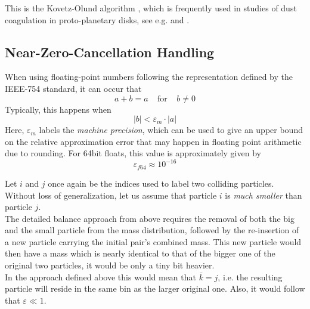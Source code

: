         This is the Kovetz-Olund algorithm \cite{kovetz_olund_1969}, which is frequently used 
        in studies of dust coagulation in proto-planetary disks, see e.g.
        \cite{brauer_dullemond_henning_2007} and \cite{birnstiel_dullemond_brauer_2010}.
    
    \clearpage\subsection{Near-Zero-Cancellation Handling}
    \label{sec:near_zero_cancellation_handling}
    
        When using floating-point numbers following the representation defined
        by the IEEE-754 standard, it can occur that
        \begin{equation}
          a + b = a
          \ \ \ \ \ \text{for} \ \ \ \ \
          b\neq0
        \end{equation}
        Typically, this happens when
        \begin{equation}
            |b| < \varepsilon_m \cdot |a|
        \end{equation}
        Here, $\varepsilon_m$ labels the \textit{machine precision}, which can be used to give 
        an upper bound on the relative approximation error that may happen in floating point 
        arithmetic due to rounding. For 64bit floats, this value is approximately given by
        \begin{equation}
            \varepsilon_{f64} \approx 10^{-16}
        \end{equation}
        
        Let $i$ and $j$ once again be the indices used to label two colliding particles. 
        Without loss of generalization, let us assume that particle $i$ is 
        \textit{much smaller} than particle $j$. \\
        
        The detailed balance approach from above requires the removal of both the big and the small 
        particle from the mass distribution, followed by the re-insertion of a new particle 
        carrying the initial pair's combined mass. This new particle would then have a mass which 
        is nearly identical to that of the bigger one of the original two particles, it would be 
        only a tiny bit heavier.\\
        
        In the approach defined above this would mean that $\bar k=j$, i.e. the resulting particle 
        will reside in the same bin as the larger original one. Also, it would follow that 
        $\varepsilon\ll1$.\\
        

